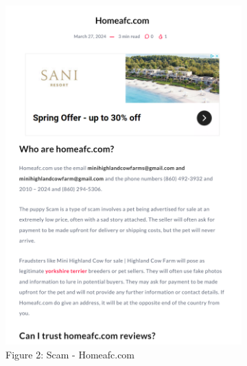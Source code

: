 \documentclass[ oneside,%
                    author={Cassie Qing Tang},
                    degree={BSc},
                     title={The Report for 3D Modelling of Queens Library \\ },
                    subtitle={ }]{dissertation}
\begin{document}
\begin{figure}[!htb]\ContinuedFloat
    \centering
    \begin{subfigure}[b]{0.45\textwidth}
        \includegraphics[width=\linewidth]{pic/figure2.png}
        \caption{Figure 2: Scam - Homeafc.com}
        \label{fig:sub2}
    \end{subfigure}
    \hfill %
    \begin{subfigure}[b]{0.45\textwidth}

\end{subfigure}
\end{figure}
\end{document}
